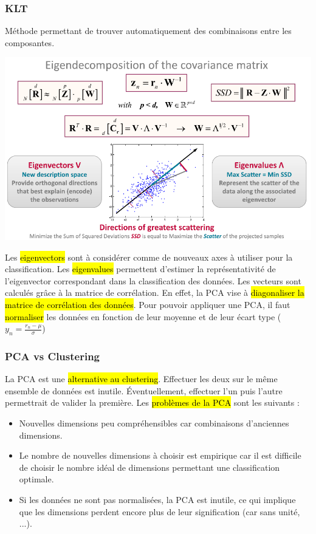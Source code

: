 \documentclass[letterpaper, 12pt]{article}
\newcommand{\alinea}{
\hspace*{0.5cm}}
\begin{document}
			\subsubsection{KLT}
				\alinea Méthode permettant de trouver automatiquement des combinaisons entre les composantes.
				\begin{center}
					\includegraphics[width=5.5in]{Images/eigen}
				\end{center}
				\alinea Les \hl{eigenvectors} sont à considérer comme de nouveaux axes à utiliser pour la classification. Les
					\hl{eigenvalues} permettent d'estimer la représentativité de l'eigenvector correspondant dans la classification 
					des données. Les vecteurs sont calculés grâce à la matrice de corrélation. En effet, la PCA vise à \hl{diagonaliser
					la matrice de corrélation des données}. Pour pouvoir appliquer une PCA, 
					il faut \hl{normaliser} les données en fonction de leur moyenne et de leur écart type 
					($y_n = \frac{r_n - \mu}{\sigma}$)	
			\subsubsection{PCA vs Clustering}
				\alinea La PCA est une \hl{alternative au clustering}. Effectuer les deux sur le même ensemble de données est inutile.
					\'Eventuellement, effectuer l'un puis l'autre permettrait de valider la première. 
					Les \hl{problèmes de la PCA} sont les suivants :
					\begin{itemize}
						\setlength\itemsep{0cm}
						\item Nouvelles dimensions peu compréhensibles car combinaisons d'anciennes dimensions.
						\item Le nombre de nouvelles dimensions à choisir est empirique car il est difficile de choisir le nombre
							idéal de dimensions permettant une classification optimale.
						\item Si les données ne sont pas normalisées, la PCA est inutile, ce qui implique que les dimensions
							perdent encore plus de leur signification (car sans unité, ...).
					\end{itemize}
\end{document}
